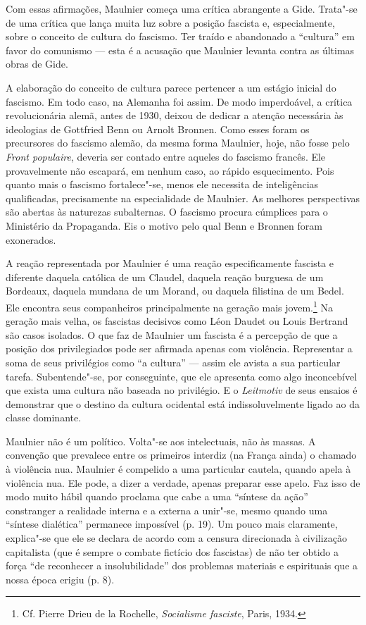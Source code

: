 Com essas afirmações, Maulnier começa uma crítica abrangente a Gide. Trata"-se de
uma crítica que lança muita luz sobre a posição fascista e,
especialmente, sobre o conceito de cultura do fascismo. Ter traído e
abandonado a ``cultura'' em favor do comunismo --- esta é a acusação que
Maulnier levanta contra as últimas obras de Gide.

A elaboração do conceito de cultura parece pertencer a um estágio
inicial do fascismo. Em todo caso, na Alemanha foi assim. De modo
imperdoável, a crítica revolucionária alemã, antes de 1930, deixou de
dedicar a atenção necessária às ideologias de Gottfried Benn ou Arnolt
Bronnen. Como esses foram os precursores do fascismo alemão, da mesma
forma Maulnier, hoje, não fosse pelo \emph{Front populaire}, deveria ser
contado entre aqueles do fascismo francês. Ele provavelmente não
escapará, em nenhum caso, ao rápido esquecimento. Pois quanto mais o
fascismo fortalece"-se, menos ele necessita de inteligências
qualificadas, precisamente na especialidade de Maulnier. As melhores
perspectivas são abertas às naturezas subalternas. O fascismo procura
cúmplices para o Ministério da Propaganda. Eis o motivo pelo qual Benn e Bronnen
foram exonerados.

A reação representada por Maulnier é uma reação especificamente fascista
e diferente daquela católica de um Claudel, daquela reação burguesa de
um Bordeaux, daquela mundana de um Morand, ou daquela filistina de um
Bedel. Ele encontra seus companheiros principalmente na geração mais
jovem.\footnote{Cf. Pierre Drieu de la Rochelle, \emph{Socialisme
  fasciste}, Paris, 1934. \versal{[N. A.]}} Na geração mais velha, os fascistas
decisivos como Léon Daudet ou Louis Bertrand são casos isolados. O que
faz de Maulnier um fascista é a percepção de que a posição dos
privilegiados pode ser afirmada apenas com violência. Representar a soma
de seus privilégios como ``a cultura'' --- assim ele avista a sua
particular tarefa. Subentende"-se, por conseguinte, que ele apresenta
como algo inconcebível que exista uma cultura não baseada no privilégio. E o
\emph{Leitmotiv} de seus ensaios é demonstrar que o destino da cultura
ocidental está indissoluvelmente ligado ao da classe dominante.

Maulnier não é um político. Volta"-se aos intelectuais, não às massas. A
convenção que prevalece entre os primeiros interdiz (na França ainda) o
chamado à violência nua. Maulnier é compelido a uma particular cautela,
quando apela à violência nua. Ele pode, a dizer a verdade, apenas
preparar esse apelo. Faz isso de modo muito hábil quando proclama que
cabe a uma ``síntese da ação'' constranger a realidade interna e a
externa a unir"-se, mesmo quando uma ``síntese dialética'' permanece impossível (p.
19). Um pouco mais claramente, explica"-se que ele se declara de acordo
com a censura direcionada à civilização capitalista (que é sempre o
combate fictício dos fascistas) de não ter obtido a força ``de reconhecer
a insolubilidade'' dos problemas materiais e espirituais que
a nossa época erigiu (p. 8).

